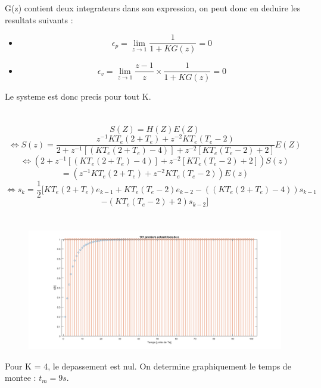 \documentclass[14pt]{extarticle}
\begin{document}
\section{}
G(z) contient deux integrateurs dans son expression, on peut donc en deduire les resultats suivants :
\begin{itemize}
    \item \[\epsilon_p = \lim_{z\to1} \frac{1}{1+KG(z)} = 0\]
    \item \[\epsilon_v = \lim_{z\to1} \frac{z-1}{z} \times \frac{1}{1+KG(z)} = 0\]
\end{itemize}
Le systeme est donc precis pour tout K.

\section{}
\[{S(Z)} = H(Z)E(Z) \]
\[\Leftrightarrow S(z) = \frac{z^{-1}KT_e(2+T_e) + z^{-2}KT_e(T_e-2) }{2+z^{-1}[(KT_e(2+T_e) - 4)] + z^{-2} [KT_e(T_e-2) +2]} E(Z)\]
\[\Leftrightarrow (2+z^{-1}[(KT_e(2+T_e) - 4)] + z^{-2} [KT_e(T_e-2) +2])S(z)\]  \[= (z^{-1}KT_e(2+T_e) + z^{-2}KT_e(T_e-2))E(z)\] 
\[\Leftrightarrow s_k = \frac{1}{2} [KT_e(2+T_e)e_{k-1} + KT_e(T_e - 2)e_{k-2} - ((KT_e(2+T_e)-4))s_{k-1} \] \[ - (KT_e(T_e-2)+2)s_{k-2}]\]

\break
\section{
}

\begin{figure}[tbh]
\vspace{0.1cm}
    \centering
    \includegraphics[width=\columnwidth]{tp2_9.png}
    \footnotesize
    \vspace{\baselineskip}
\end{figure}


Pour K = 4, le depassement est nul. 
On determine graphiquement le temps de montee : $t_m = 9s$.
\end{document}
